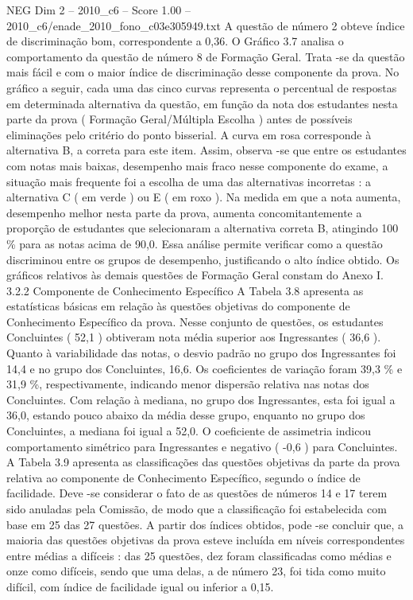 \begin{textsample}{NEG Dim 2 – 2010\_c6 – Score 1.00 – 2010\_c6/enade\_2010\_fono\_c03e305949.txt}
A questão de número 2 obteve índice de discriminação bom, correspondente a 0,36.
O Gráfico 3.7 analisa o comportamento da questão de número 8 de Formação Geral.
Trata -se da questão mais fácil e com o maior índice de discriminação desse componente da prova.
No gráfico a seguir, cada uma das cinco curvas representa o percentual de respostas em determinada alternativa da questão, em função da nota dos estudantes nesta parte da prova ( Formação Geral/Múltipla Escolha ) antes de possíveis eliminações pelo critério do ponto bisserial.
A curva em rosa corresponde à alternativa B, a correta para este item.
Assim, observa -se que entre os estudantes com notas mais baixas, desempenho mais fraco nesse componente do exame, a situação mais frequente foi a escolha de uma das alternativas incorretas : a alternativa C ( em verde ) ou E ( em roxo ).
Na medida em que a nota aumenta, desempenho melhor nesta parte da prova, aumenta concomitantemente a proporção de estudantes que selecionaram a alternativa correta B, atingindo 100 \% para as notas acima de 90,0.
Essa análise permite verificar como a questão discriminou entre os grupos de desempenho, justificando o alto índice obtido.
Os gráficos relativos às demais questões de Formação Geral constam do Anexo I. 3.2.2 Componente de Conhecimento Específico A Tabela 3.8 apresenta as estatísticas básicas em relação às questões objetivas do componente de Conhecimento Específico da prova.
Nesse conjunto de questões, os estudantes Concluintes ( 52,1 ) obtiveram nota média superior aos Ingressantes ( 36,6 ).
Quanto à variabilidade das notas, o desvio padrão no grupo dos Ingressantes foi 14,4 e no grupo dos Concluintes, 16,6.
Os coeficientes de variação foram 39,3 \% e 31,9 \%, respectivamente, indicando menor dispersão relativa nas notas dos Concluintes.
Com relação à mediana, no grupo dos Ingressantes, esta foi igual a 36,0, estando pouco abaixo da média desse grupo, enquanto no grupo dos Concluintes, a mediana foi igual a 52,0.
O coeficiente de assimetria indicou comportamento simétrico para Ingressantes e negativo ( -0,6 ) para Concluintes.
A Tabela 3.9 apresenta as classificações das questões objetivas da parte da prova relativa ao componente de Conhecimento Específico, segundo o índice de facilidade.
Deve -se considerar o fato de as questões de números 14 e 17 terem sido anuladas pela Comissão, de modo que a classificação foi estabelecida com base em 25 das 27 questões.
A partir dos índices obtidos, pode -se concluir que, a maioria das questões objetivas da prova esteve incluída em níveis correspondentes entre médias a difíceis : das 25 questões, dez foram classificadas como médias e onze como difíceis, sendo que uma delas, a de número 23, foi tida como muito difícil, com índice de facilidade igual ou inferior a 0,15.

\end{textsample}
